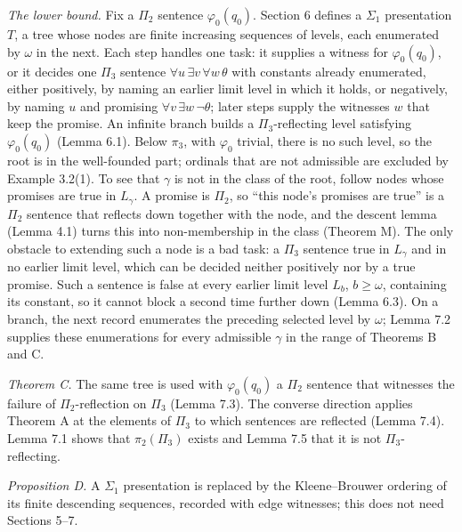 \documentclass[11pt]{article}
\begin{document}
\emph{The lower bound.} Fix a $\Pi_2$ sentence $\varphi_0(q_0)$. Section 6 defines a $\Sigma_1$ presentation $T$,
a tree whose nodes are finite increasing sequences of levels, each enumerated by $\omega$ in the next. Each step
handles one task: it supplies a witness for $\varphi_0(q_0)$, or it decides one $\Pi_3$ sentence
$\forall u\, \exists v\, \forall w\, \theta$ with constants already enumerated, either positively, by naming an
earlier limit level in which it holds, or negatively, by naming $u$ and promising $\forall v\, \exists w\, \neg\theta$;
later steps supply the witnesses $w$ that keep the promise. An infinite branch builds a $\Pi_3$-reflecting level
satisfying $\varphi_0(q_0)$ (Lemma 6.1). Below $\pi_3$, with $\varphi_0$ trivial, there is no such level, so the root is
in the well-founded part; ordinals that are not admissible are excluded by Example 3.2(1). To see that $\gamma$ is not in the class of the root, follow nodes whose promises are true
in $L_{\gamma}$. A promise is $\Pi_2$, so ``this node's promises are true'' is a $\Pi_2$ sentence that reflects down
together with the node, and the descent lemma (Lemma 4.1) turns this into non-membership in the class (Theorem M).
The only obstacle to extending such a node is a bad task: a $\Pi_3$ sentence true in $L_{\gamma}$ and in no earlier
limit level, which can be decided neither positively nor by a true promise. Such a sentence is false at every earlier limit level $L_b$, $b \ge \omega$,
containing its constant, so it cannot block a second time further down (Lemma 6.3). On a branch, the next record enumerates the
preceding selected level by $\omega$; Lemma 7.2 supplies these enumerations for every admissible $\gamma$ in the range
of Theorems B and C.

\emph{Theorem C.} The same tree is used with $\varphi_0(q_0)$ a $\Pi_2$ sentence that witnesses the failure of
$\Pi_2$-reflection on $\Pi_3$ (Lemma 7.3). The converse direction applies Theorem A at the elements of $\Pi_3$ to which
sentences are reflected (Lemma 7.4). Lemma 7.1 shows that $\pi_2(\Pi_3)$ exists and Lemma 7.5 that it is not
$\Pi_3$-reflecting.

\emph{Proposition D.} A $\Sigma_1$ presentation is replaced by the Kleene--Brouwer ordering of its finite descending
sequences, recorded with edge witnesses; this does not need Sections 5--7.
\end{document}
